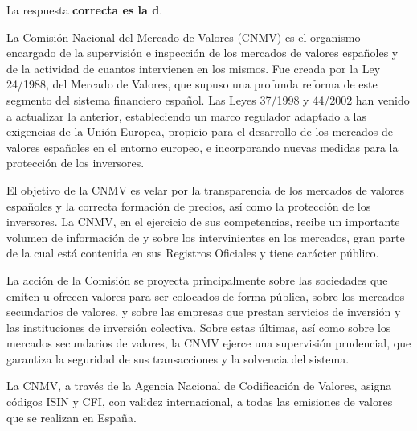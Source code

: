 \documentclass[
  letterpaper,
  DIV=11,
  numbers=noendperiod]{scrreprt}
\begin{document}
\begin{tcolorbox}[enhanced jigsaw, left=2mm, opacityback=0, colback=white, breakable, arc=.35mm, bottomrule=.15mm, rightrule=.15mm, toprule=.15mm, leftrule=.75mm, colframe=quarto-callout-tip-color-frame]
\begin{minipage}[t]{5.5mm}
\textcolor{quarto-callout-tip-color}{\faLightbulb}
\end{minipage}%
\begin{minipage}[t]{\textwidth - 5.5mm}

La respuesta \textbf{correcta es la d}.

La Comisión Nacional del Mercado de Valores (CNMV) es el organismo
encargado de la supervisión e inspección de los mercados de valores
españoles y de la actividad de cuantos intervienen en los mismos. Fue
creada por la Ley 24/1988, del Mercado de Valores, que supuso una
profunda reforma de este segmento del sistema financiero español. Las
Leyes 37/1998 y 44/2002 han venido a actualizar la anterior,
estableciendo un marco regulador adaptado a las exigencias de la Unión
Europea, propicio para el desarrollo de los mercados de valores
españoles en el entorno europeo, e incorporando nuevas medidas para la
protección de los inversores.

El objetivo de la CNMV es velar por la transparencia de los mercados de
valores españoles y la correcta formación de precios, así como la
protección de los inversores. La CNMV, en el ejercicio de sus
competencias, recibe un importante volumen de información de y sobre los
intervinientes en los mercados, gran parte de la cual está contenida en
sus Registros Oficiales y tiene carácter público.

La acción de la Comisión se proyecta principalmente sobre las sociedades
que emiten u ofrecen valores para ser colocados de forma pública, sobre
los mercados secundarios de valores, y sobre las empresas que prestan
servicios de inversión y las instituciones de inversión colectiva. Sobre
estas últimas, así como sobre los mercados secundarios de valores, la
CNMV ejerce una supervisión prudencial, que garantiza la seguridad de
sus transacciones y la solvencia del sistema.

La CNMV, a través de la Agencia Nacional de Codificación de Valores,
asigna códigos ISIN y CFI, con validez internacional, a todas las
emisiones de valores que se realizan en España.

\end{minipage}%
\end{tcolorbox}
\end{document}
